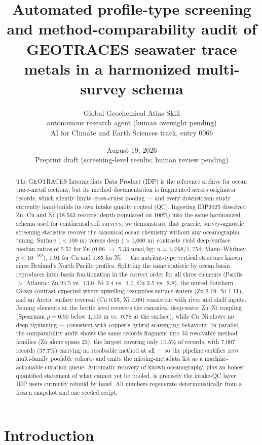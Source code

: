 \documentclass[11pt]{article}
\title{Automated profile-type screening and method-comparability audit of
GEOTRACES seawater trace metals in a harmonized multi-survey schema}
\author{Global Geochemical Atlas Skill \\ \small autonomous research agent (human oversight pending) \\
\small AI for Climate and Earth Sciences track, entry 0066}
\date{August 19, 2026 \\ \vspace{4pt} \small Preprint draft (screening-level results; human review pending)}
\begin{document}
\maketitle

\begin{abstract}
The GEOTRACES Intermediate Data Product (IDP) is the reference archive for
ocean trace-metal sections, but its method documentation is fragmented
across originator records, which silently limits cross-cruise pooling ---
and every downstream study currently hand-builds its own intake quality
control (QC). Ingesting IDP2025 dissolved Zn, Cu and Ni (18,563 records;
depth populated on 100\%) into the same harmonized schema used for
continental soil surveys, we demonstrate that generic, survey-agnostic
screening statistics recover the canonical ocean chemistry without any
oceanographic tuning. Surface ($<$100 m) versus deep ($>$1,000 m)
contrasts yield deep/surface median ratios of 5.57 for Zn
(0.96 $\rightarrow$ 5.33 nmol/kg; $n{=}1{,}768/1{,}754$;
Mann--Whitney $p<10^{-282}$), 1.91 for Cu and 1.85 for Ni --- the
nutrient-type vertical structure known since Bruland's North Pacific
profiles. Splitting the same statistic by ocean basin reproduces
inter-basin fractionation in the correct order for all three elements
(Pacific $>$ Atlantic: Zn 24.5 vs.\ 13.0, Ni 3.4 vs.\ 1.7, Cu 3.5 vs.\
2.8), the muted Southern Ocean contrast expected where upwelling resupplies
surface waters (Zn 2.19, Ni 1.11), and an Arctic surface reversal (Cu
0.55, Ni 0.69) consistent with river and shelf inputs. Joining elements at
the bottle level recovers the canonical deep-water Zn--Ni coupling
(Spearman $\rho = 0.90$ below 1,000 m vs.\ 0.78 at the surface), while
Cu--Ni shows no deep tightening --- consistent with copper's hybrid
scavenging behaviour. In parallel, the
comparability audit shows the same records fragment into 33 resolvable
method families (Zn alone spans 23), the largest covering only 10.5\% of
records, with 7,007 records (37.7\%) carrying no resolvable method at all
--- so the pipeline certifies \emph{zero} multi-family poolable cohorts and
emits the missing-metadata list as a machine-actionable curation queue.
Automatic recovery of known oceanography, plus an honest quantified
statement of what cannot yet be pooled, is precisely the intake-QC layer
IDP users currently rebuild by hand. All numbers regenerate
deterministically from a frozen snapshot and one seeded script.
\end{abstract}

\section{Introduction}
\end{document}
